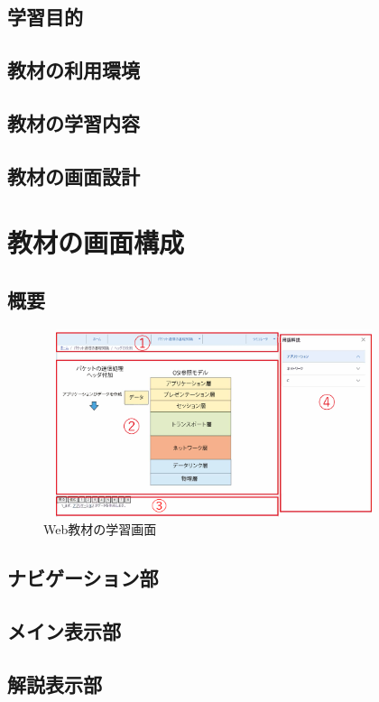 \documentclass[12pt,a4j,titlepage]{ltjsarticle}
\begin{document}
\subsection{学習目的}
\subsection{教材の利用環境}
\subsection{教材の学習内容}
\subsection{教材の画面設計}

\clearpage
\section{教材の画面構成}
\subsection{概要}

\begin{figure}[h]
\begin{center}
 \includegraphics[clip,width=100mm,height=55mm]{figures/gamen.pdf}
\end{center}
 \caption{Web教材の学習画面}
 \label{fig:画面}
\end{figure}

\subsection{ナビゲーション部}
\subsection{メイン表示部}
\subsection{解説表示部}
\end{document}

